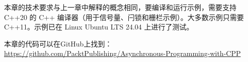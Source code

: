 

本章的技术要求与上一章中解释的概念相同，要编译和运行示例，需要支持 C++20 的 C++ 编译器（用于信号量、闩锁和栅栏示例）。大多数示例只需要 C++11。示例已在 Linux Ubuntu LTS 24.04 上进行了测试。

本章的代码可以在GitHub上找到： \url{https://github.com/PacktPublishing/Asynchronous-Programming-with-CPP}